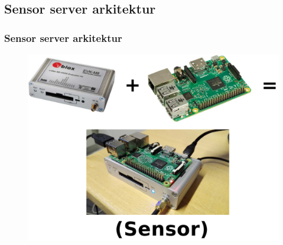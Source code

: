 \documentclass[xcolor=table]{beamer}
\begin{document}
\subsection{Sensor server arkitektur}
\begin{frame}
  \frametitle{Sensor server arkitektur}
    \begin{figure}
      \includegraphics[scale=0.2]{thesis/graphics/raspi_gps.pdf}
    \end{figure}
\end{frame}
\end{document}

